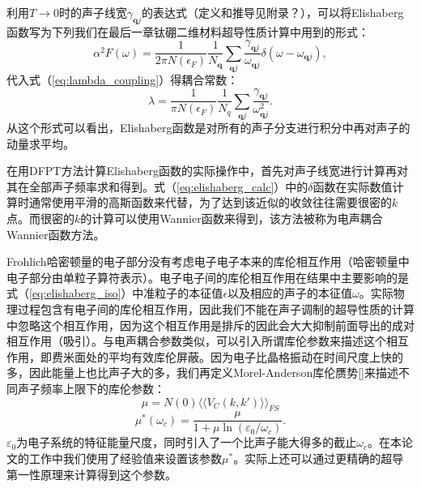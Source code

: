 利用$T\rightarrow 0$时的声子线宽$\gamma_{\bm{q}j}$的表达式（定义和推导见附录？），可以将Elishaberg函数写为下列我们在最后一章钛硼二维材料超导性质计算中用到的形式：
\begin{equation}\label{eq:elishaberg_calc}
  \alpha^2 F(\omega) = \frac{1}{2\pi N(\epsilon_F)}\frac{1}{N_{\bm{q}}}
  \sum_{\bm{q}j} \frac{\gamma_{\bm{q}j}}{\omega_{\bm{q}j}}
  \delta(\omega-\omega_{\bm{q}j}),
\end{equation}
代入式（\ref{eq:lambda_coupling}）得耦合常数：
\begin{equation}
  \lambda = \frac{1}{\pi N(\epsilon_F)}\frac{1}{N_q}
  \sum_{\bm{q}j}\frac{\gamma_{\bm{q}j}}{\omega^2_{\bm{q}j}}.
\end{equation}
从这个形式可以看出，Elishaberg函数是对所有的声子分支进行积分中再对声子的动量求平均。

在用DFPT方法计算Elishaberg函数的实际操作中，首先对声子线宽进行计算再对其在全部声子频率求和得到。式（\ref{eq:elishaberg_calc}）中的$\delta$函数在实际数值计算时通常使用平滑的高斯函数来代替，为了达到该近似的收敛往往需要很密的$k$点。而很密的$k$的计算可以使用Wannier函数来得到，该方法被称为电声耦合Wannier函数方法\cite{ponce2016epw}。

Frohlich哈密顿量的电子部分没有考虑电子电子本来的库伦相互作用（哈密顿量中电子部分由单粒子算符表示）。电子电子间的库伦相互作用在结果中主要影响的是式（\ref{eq:elishaberg_iso}）中准粒子的本征值$\epsilon$以及相应的声子的本征值$\omega$。实际物理过程包含有电子间的库伦相互作用，因此我们不能在声子调制的超导性质的计算中忽略这个相互作用，因为这个相互作用是排斥的因此会大大抑制前面导出的成对相互作用（吸引）。与电声耦合参数类似，可以引入所谓库伦参数来描述这个相互作用，即费米面处的平均有效库伦屏蔽。因为电子比晶格振动在时间尺度上快的多，因此能量上也比声子大的多，我们再定义Morel-Anderson库伦赝势[]来描述不同声子频率上限下的库伦参数：
\begin{equation}
  \mu = N(0)\langle\langle {V_C(k,k')} \rangle\rangle_{FS}
\end{equation}
\begin{equation}
  \mu^*(\omega_c) = \frac{\mu}{1+\mu \ln(\varepsilon_0/\omega_c)}.
\end{equation}
$\varepsilon_0$为电子系统的特征能量尺度，同时引入了一个比声子能大得多的截止$\omega_c$。在本论文的工作中我们使用了经验值来设置该参数$\mu^*$。实际上还可以通过更精确的超导第一性原理来计算得到这个参数\cite{kohn1989orbital}。


